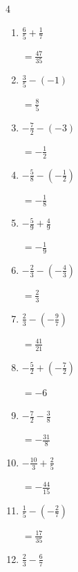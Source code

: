 \begin{multicols}{4}
\begin{enumerate}
        $\displaystyle =14$

  \item $\displaystyle \frac{6}{5} + \frac{1}{7}$

        $\displaystyle =\frac{47}{35}$

  \item $\displaystyle \frac{3}{5} - \left(-1\right)$

        $\displaystyle =\frac{8}{5}$

  \item $\displaystyle -\frac{7}{2} - \left(-3\right)$

        $\displaystyle =-\frac{1}{2}$

  \item $\displaystyle -\frac{5}{8} - \left(-\frac{1}{2}\right)$

        $\displaystyle =-\frac{1}{8}$

  \item $\displaystyle -\frac{5}{9} + \frac{4}{9}$

        $\displaystyle =-\frac{1}{9}$

\columnbreak %

  \item $\displaystyle -\frac{2}{3} - \left(-\frac{4}{3}\right)$

        $\displaystyle =\frac{2}{3}$

  \item $\displaystyle \frac{2}{3} - \left(-\frac{9}{7}\right)$

        $\displaystyle =\frac{41}{21}$

  \item $\displaystyle -\frac{5}{2} + \left(-\frac{7}{2}\right)$

        $\displaystyle =-6$

  \item $\displaystyle -\frac{7}{2} - \frac{3}{8}$

        $\displaystyle =-\frac{31}{8}$

  \item $\displaystyle -\frac{10}{3} + \frac{2}{5}$

        $\displaystyle =-\frac{44}{15}$

  \item $\displaystyle \frac{1}{5} - \left(-\frac{2}{7}\right)$

        $\displaystyle =\frac{17}{35}$

  \item $\displaystyle \frac{2}{3} - \frac{6}{7}$


\end{enumerate}
\end{multicols}

